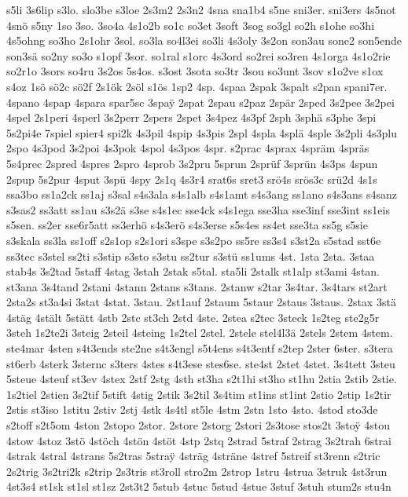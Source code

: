 {s5li
3s6lip
s3lo.
slo3be
s3loe
2s3m2
2s3n2
4sna
sna1b4
s5ne
sni3er.
sni3ers
4s5not
4snö
s5ny
1so
3so.
3so4a
4s1o2b
so1c
so3et
3soft
3sog
so3gl
so2h
s1ohe
so3hi
4s5ohng
so3ho
2s1ohr
3sol.
so3la
so4l3ei
so3li
4s3oly
3s2on
son3au
sone2
son5ende
son3sä
so2ny
so3o
s1opf
3sor.
so1ral
s1orc
4s3ord
so2rei
so3ren
4s1orga
4s1o2rie
so2r1o
3sors
so4ru
3s2os
5s4os.
s3ost
3sota
so3tr
3sou
so3unt
3sov
s1o2ve
s1ox
s4oz
1sö
sö2c
sö2f
2s1ök
2söl
s1ös
1sp2
4sp.
4spaa
2spak
3spalt
s2pan
spani7er.
4spano
4spap
4spara
spar5sc
3spa^^ff
2spat
2spau
s2paz
2spär
2sped
3s2pee
3s2pei
4spel
2s1peri
4sperl
3s2perr
2spers
2spet
3s4pez
4s3pf
2sph
3sphä
s3phe
3spi
5s2pi4e
7spiel
spier4
spi2k
4s3pil
4spip
4s3pis
2spl
4spla
4splä
4sple
3s2pli
4s3plu
2spo
4s3pod
3s2poi
4s3pok
4spol
4s3pos
4spr.
s2prac
4sprax
4spräm
4spräs
5s4prec
2spred
4spres
2spro
4sprob
3s2pru
5sprun
2sprüf
3sprün
4s3ps
4spun
2spup
5s2pur
4sput
3spü
4spy
2s1q
4s3r4
srat6s
sret3
srö4s
srös3c
srü2d
4s1s
ssa3bo
ss1a2ck
ss1aj
s3sal
s4s3ala
s4s1alb
s4s1amt
s4s3ang
ss1ano
s4s3ans
s4sanz
s3sas2
ss3att
ss1au
s3s2ä
s3se
s4s1ec
sse4ck
s4s1ega
sse3ha
sse3inf
sse3int
ss1eis
s5sen.
ss2er
sse6r5att
ss3erhö
s4s3erö
s4s3erse
s5s4es
ss4et
sse3ta
ss5g
s5sie
s3skala
ss3la
ss1off
s2s1op
s2s1ori
s3spe
s3s2po
ss5re
ss3s4
s3st2a
s5stad
sst6e
ss3tec
s3stel
ss2ti
s3stip
s3sto
s3stu
ss2tur
s3stü
ss1ums
4st.
1sta
2sta.
3staa
stab4s
3s2tad
5staff
4stag
3stah
2stak
s5tal.
sta5li
2stalk
st1alp
st3ami
4stan.
st3ana
3s4tand
2stani
4stann
2stans
s3tans.
2stanw
s2tar
3s4tar.
3s4tars
st2art
2sta2s
st3a4si
3stat
4stat.
3stau.
2st1auf
2staum
5staur
2staus
3staus.
2stax
3stä
4stäg
4stält
5stätt
4stb
2stc
st3ch
2std
4ste.
2stea
s2tec
3steck
1s2teg
ste2g5r
3steh
1s2te2i
3steig
2steil
4steing
1s2tel
2stel.
2stele
stel4l3ä
2stels
2stem
4stem.
ste4mar
4sten
s4t3ends
ste2ne
s4t3engl
s5t4ens
s4t3entf
s2tep
2ster
6ster.
s3tera
st6erb
4sterk
3sternc
s3ters
4stes
s4t3ese
stes6se.
ste4st
2stet
4stet.
3s4tett
3steu
5steue
4steuf
st3ev
4stex
2stf
2stg
4sth
st3ha
s2t1hi
st3ho
st1hu
2stia
2stib
2stie.
1s2tiel
2stien
3s2tif
5stift
4stig
2stik
3s2til
3s4tim
st1ins
st1int
2stio
2stip
1s2tir
2stis
st3iso
1stitu
2stiv
2stj
4stk
4s4tl
st5le
4stm
2stn
1sto
4sto.
4stod
sto3de
s2toff
s2t5om
4ston
2stopo
2stor.
2store
2storg
2stori
2s3tose
stos2t
3sto^^ff
4stou
4stow
4stoz
3stö
4stöch
4stön
4stöt
4stp
2stq
2strad
5straf
2strag
3s2trah
6strai
4strak
4stral
4strans
5s2tras
5stra^^ff
4sträg
4sträne
4stref
5streif
st3renn
s2tric
2s2trig
3s2tri2k
s2trip
2s3tris
st3roll
stro2m
2strop
1stru
4strua
3struk
4st3run
4st3s4
st1sk
st1sl
st1sz
2st3t2
5stub
4stuc
5stud
4stue
3stuf
3stuh
stum2s
stu4n
}
